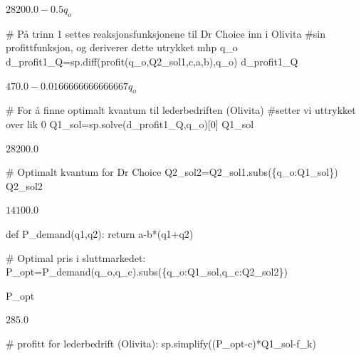\documentclass[
  12pt,
  a4paper,
  DIV=11,
  numbers=noendperiod]{scrartcl}
\newenvironment{Shaded}{\begin{snugshade}}{\end{snugshade}}
\newcommand{\CommentTok}[1]{\textcolor[rgb]{0.37,0.37,0.37}{#1}}
\newcommand{\ControlFlowTok}[1]{\textcolor[rgb]{0.00,0.23,0.31}{#1}}
\newcommand{\DecValTok}[1]{\textcolor[rgb]{0.68,0.00,0.00}{#1}}
\newcommand{\KeywordTok}[1]{\textcolor[rgb]{0.00,0.23,0.31}{#1}}
\newcommand{\NormalTok}[1]{\textcolor[rgb]{0.00,0.23,0.31}{#1}}
\newcommand{\OperatorTok}[1]{\textcolor[rgb]{0.37,0.37,0.37}{#1}}
\begin{document}
$\displaystyle 28200.0 - 0.5 q_{o}$

\begin{Shaded}
\begin{Highlighting}[]
\CommentTok{\# På trinn 1 settes reaksjonsfunksjonene til Dr Choice inn i Olivita }
\CommentTok{\#sin profittfunksjon, og deriverer dette utrykket mhp q\_o}
\NormalTok{d\_profit1\_Q}\OperatorTok{=}\NormalTok{sp.diff(profit(q\_o,Q2\_sol1,c,a,b),q\_o)}
\NormalTok{d\_profit1\_Q}
\end{Highlighting}
\end{Shaded}

$\displaystyle 470.0 - 0.0166666666666667 q_{o}$

\begin{Shaded}
\begin{Highlighting}[]
\CommentTok{\# For å finne optimalt kvantum til lederbedriften (Olivita)}
\CommentTok{\#setter vi uttrykket over lik 0}
\NormalTok{Q1\_sol}\OperatorTok{=}\NormalTok{sp.solve(d\_profit1\_Q,q\_o)[}\DecValTok{0}\NormalTok{]}
\NormalTok{Q1\_sol}
\end{Highlighting}
\end{Shaded}

$\displaystyle 28200.0$

\begin{Shaded}
\begin{Highlighting}[]
\CommentTok{\# Optimalt kvantum for Dr Choice}
\NormalTok{Q2\_sol2}\OperatorTok{=}\NormalTok{Q2\_sol1.subs(\{q\_o:Q1\_sol\})}
\NormalTok{Q2\_sol2}
\end{Highlighting}
\end{Shaded}

$\displaystyle 14100.0$

\begin{Shaded}
\begin{Highlighting}[]
\KeywordTok{def}\NormalTok{ P\_demand(q1,q2):}
    \ControlFlowTok{return}\NormalTok{ a}\OperatorTok{{-}}\NormalTok{b}\OperatorTok{*}\NormalTok{(q1}\OperatorTok{+}\NormalTok{q2)}
    
\CommentTok{\# Optimal pris i sluttmarkedet:}
\NormalTok{P\_opt}\OperatorTok{=}\NormalTok{P\_demand(q\_o,q\_c).subs(\{q\_o:Q1\_sol,q\_c:Q2\_sol2\})}

\NormalTok{P\_opt}
\end{Highlighting}
\end{Shaded}

$\displaystyle 285.0$

\begin{Shaded}
\begin{Highlighting}[]
\CommentTok{\# profitt for lederbedrift (Olivita):}
\NormalTok{sp.simplify((P\_opt}\OperatorTok{{-}}\NormalTok{c)}\OperatorTok{*}\NormalTok{Q1\_sol}\OperatorTok{{-}}\NormalTok{f\_k)}
\end{Highlighting}
\end{Shaded}
\end{document}
